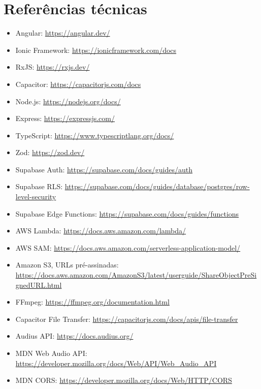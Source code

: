 \documentclass[12pt,a4paper,oneside]{report}
\begin{document}
\chapter{Referências técnicas}
\begin{itemize}
\item Angular: \url{https://angular.dev/}
\item Ionic Framework: \url{https://ionicframework.com/docs}
\item RxJS: \url{https://rxjs.dev/}
\item Capacitor: \url{https://capacitorjs.com/docs}
\item Node.js: \url{https://nodejs.org/docs/}
\item Express: \url{https://expressjs.com/}
\item TypeScript: \url{https://www.typescriptlang.org/docs/}
\item Zod: \url{https://zod.dev/}
\item Supabase Auth: \url{https://supabase.com/docs/guides/auth}
\item Supabase RLS: \url{https://supabase.com/docs/guides/database/postgres/row-level-security}
\item Supabase Edge Functions: \url{https://supabase.com/docs/guides/functions}
\item AWS Lambda: \url{https://docs.aws.amazon.com/lambda/}
\item AWS SAM: \url{https://docs.aws.amazon.com/serverless-application-model/}
\item Amazon S3, URLs pré-assinadas: \url{https://docs.aws.amazon.com/AmazonS3/latest/userguide/ShareObjectPreSignedURL.html}
\item FFmpeg: \url{https://ffmpeg.org/documentation.html}
\item Capacitor File Transfer: \url{https://capacitorjs.com/docs/apis/file-transfer}
\item Audius API: \url{https://docs.audius.org/}
\item MDN Web Audio API: \url{https://developer.mozilla.org/docs/Web/API/Web_Audio_API}
\item MDN CORS: \url{https://developer.mozilla.org/docs/Web/HTTP/CORS}
\end{itemize}
\end{document}
